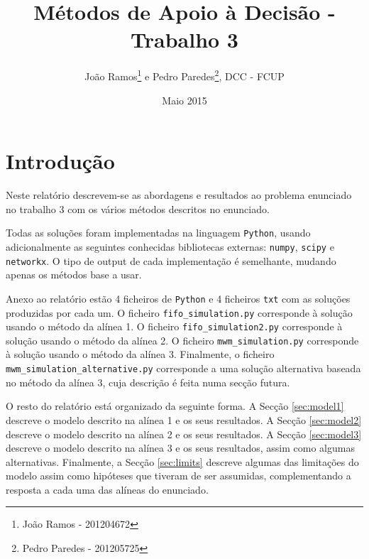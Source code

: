 \documentclass[10pt,a4paper,oneside]{article}
\title{Métodos de Apoio à Decisão - Trabalho 3}
\author{João Ramos\footnote{João Ramos -  201204672} e Pedro Paredes\footnote{Pedro Paredes - 201205725}, DCC - FCUP}
\date{Maio 2015}
\begin{document}
\maketitle


\section*{Introdução}

Neste relatório descrevem-se as abordagens e resultados ao problema
enunciado no trabalho 3 com os vários métodos descritos no enunciado.

Todas as soluções foram implementadas na linguagem \texttt{Python},
usando adicionalmente as seguintes conhecidas bibliotecas externas:
\texttt{numpy}, \texttt{scipy} e \texttt{networkx}. O tipo de output
de cada implementação é semelhante, mudando apenas os métodos base a
usar.

Anexo ao relatório estão 4 ficheiros de \texttt{Python} e 4 ficheiros
\texttt{txt} com as soluções produzidas por cada um. O ficheiro
\texttt{fifo\_simulation.py} corresponde à solução usando o método da
alínea 1. O ficheiro \texttt{fifo\_simulation2.py} corresponde à
solução usando o método da alínea 2. O ficheiro
\texttt{mwm\_simulation.py} corresponde à solução usando o método da
alínea 3. Finalmente, o ficheiro
\texttt{mwm\_simulation\_alternative.py} corresponde a uma solução
alternativa baseada no método da alínea 3, cuja descrição é feita numa
secção futura.

O resto do relatório está organizado da seguinte forma. A Secção
\ref{sec:model1} descreve o modelo descrito na alínea 1 e os seus
resultados. A Secção \ref{sec:model2} descreve o modelo descrito na
alínea 2 e os seus resultados. A Secção \ref{sec:model3} descreve o
modelo descrito na alínea 3 e os seus resultados, assim como algumas
alternativas. Finalmente, a Secção \ref{sec:limits} descreve algumas
das limitações do modelo assim como hipóteses que tiveram de ser
assumidas, complementando a resposta a cada uma das alíneas do
enunciado.
 
\end{document}
